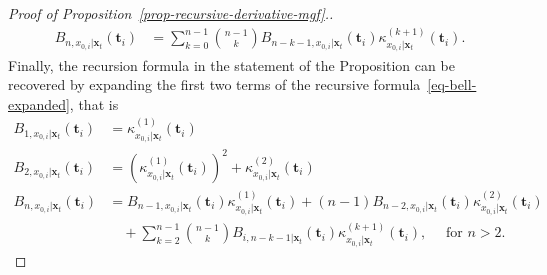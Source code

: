 \begin{proof}[Proof of Proposition~\ref{prop-recursive-derivative-mgf}.]
\begin{equation}
\label{eq-bell-expanded}
\begin{aligned}
B_{n,x_{0,i} \vert \mathbf{x}_t}(\mathbf{t}_i)&=  \sum_{k=0}^{n-1}{n-1\choose k}B_{n-k-1, x_{0,i} \vert \mathbf{x}_t}(\mathbf{t}_i) \kappa^{(k+1)}_{x_{0,i} \vert \mathbf{x}_t}(\mathbf{t}_i).
\end{aligned}
\end{equation}
Finally, the recursion formula in the statement of the Proposition can be recovered by expanding the first two terms of the recursive formula~\eqref{eq-bell-expanded}, that is
\begin{equation}
\begin{aligned}
B_{1, x_{0,i} \vert \mathbf{x}_t}(\mathbf{t}_i)&= \kappa^{(1)}_{x_{0,i} \vert \mathbf{x}_t}(\mathbf{t}_i)\\
B_{2, x_{0,i} \vert \mathbf{x}_t}(\mathbf{t}_i)&= \left(\kappa^{(1)}_{x_{0,i} \vert \mathbf{x}_t}(\mathbf{t}_i)\right)^2 + \kappa^{(2)}_{x_{0,i} \vert \mathbf{x}_t}(\mathbf{t}_i)\\
B_{n, x_{0,i} \vert \mathbf{x}_t}(\mathbf{t}_i)&=B_{n-1,x_{0,i} \vert \mathbf{x}_t}(\mathbf{t}_i)\kappa^{(1)}_{x_{0,i} \vert \mathbf{x}_t}(\mathbf{t}_i)+ (n-1)B_{n-2,x_{0,i} \vert \mathbf{x}_t}(\mathbf{t}_i)\kappa^{(2)}_{x_{0,i} \vert \mathbf{x}_t}(\mathbf{t}_i) \\
&\quad+ \sum_{k=2}^{n-1}{n-1\choose k}B_{i,n-k-1 \vert \mathbf{x}_t}(\mathbf{t}_i)\kappa^{(k+1)}_{x_{0,i} \vert \mathbf{x}_t}(\mathbf{t}_i), \quad \text{ for } n >2.
\end{aligned}
\end{equation}
\end{proof}